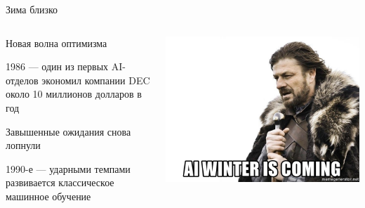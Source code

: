 \documentclass[notes,12pt, aspectratio=169]{beamer}
\newenvironment{wideitemize}{\itemize\addtolength{\itemsep}{10pt}}{\enditemize}
\begin{document}
\begin{frame}{Зима близко}
	\begin{columns}[T] 
		\begin{column}{.6\textwidth}
			\begin{wideitemize} 
				\item Новая волна оптимизма
				
				\item 1986 — один из первых AI-отделов экономил компании DEC около 10 миллионов долларов в год
				
				\item Завышенные ожидания снова лопнули
				
				\item 1990-е — ударными темпами развивается классическое машинное обучение
			\end{wideitemize} 
		\end{column}%
		\hfill%
		\begin{column}{.4\textwidth}
			\begin{center}
			\includegraphics[width=.99\linewidth]{stark.jpg}
			\end{center}
		\end{column}%
	\end{columns}
\end{frame}
\end{document}
